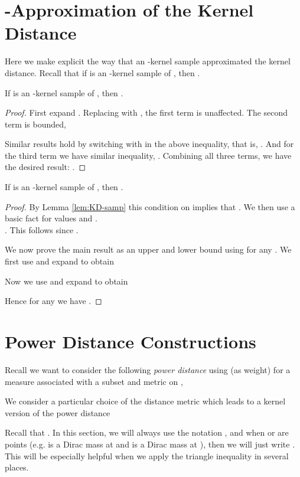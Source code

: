 \documentclass[11pt]{myclass}
\begin{document}
\section{-Approximation of the Kernel Distance}
\label{app:KD-approx}

Here we make explicit the way that an -kernel sample approximated the kernel distance.  
Recall that if  is an -kernel sample of , then .  


\begin{lemma}
\label{lem:KD-samp}
If  is an -kernel sample of , then . 
\end{lemma}
\begin{proof}
First expand .  
Replacing  with , 
the first term is unaffected.  The second term is bounded, 

Similar results hold by switching  with  in the above inequality, that is, 
.   
And for the third term we have similar inequality, .
Combining all three terms,  we have the desired result: 
  . 
\end{proof}


\begin{lemma}
\label{lem:KD-samp-nosq}
If  is an -kernel sample of , then . 
\end{lemma}
\begin{proof}
By Lemma \ref{lem:KD-samp} this condition on  implies that .  
We then use a basic fact for values  and .  
\\
 .  This follows since
.

We now prove the main result as an upper and lower bound using for any .  
We first use  and expand  to obtain


Now we use  and expand  to obtain

Hence for any  we have .  
\end{proof}







\section{Power Distance Constructions}
\label{app:power}
Recall we want to consider the following \emph{power distance} using  (as weight) for a measure  associated with a subset  and metric  on ,

We consider a particular choice of the distance metric  which leads to a kernel version of the power distance


Recall that .  In this section, we will always use the notation , and when  or  are points (e.g.  is a Dirac mass at  and  is a Dirac mass at ), then we will just write .  This will be especially helpful when we apply the triangle inequality in several places.  
\end{document}
